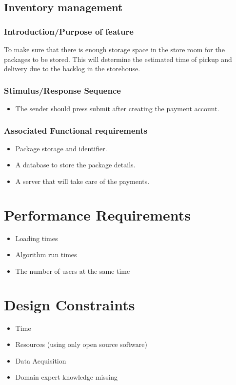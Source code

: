 \documentclass[paper=a4, fontsize=11pt]{scrartcl} %
\numberwithin{equation}{section} %
\numberwithin{figure}{section} %
\numberwithin{table}{section} %
\begin{document}
\subsection{Inventory management}
\subsubsection{Introduction/Purpose of feature}
To make sure that there is enough storage space in the store room for the packages to be stored. This will determine the estimated time of pickup and delivery due to the backlog in the storehouse.
\subsubsection{Stimulus/Response Sequence}
\begin{itemize}
\item The sender should press submit after creating the payment account.
\end{itemize}
\subsubsection{Associated Functional requirements}
\begin{itemize}
\item Package storage and identifier.
\item A database to store the package details.
\item A server that will take care of the payments.
\end{itemize}


\section{Performance Requirements}
\begin{itemize}
			\item Loading times
			\item Algorithm run times 
			\item The number of users at the same time 
\end{itemize}
	
\section{Design Constraints}
\begin{itemize}
			\item Time
			\item Resources (using only open source software) 
			\item Data Acquisition
			\item Domain expert knowledge missing  
\end{itemize}
	
\end{document}
